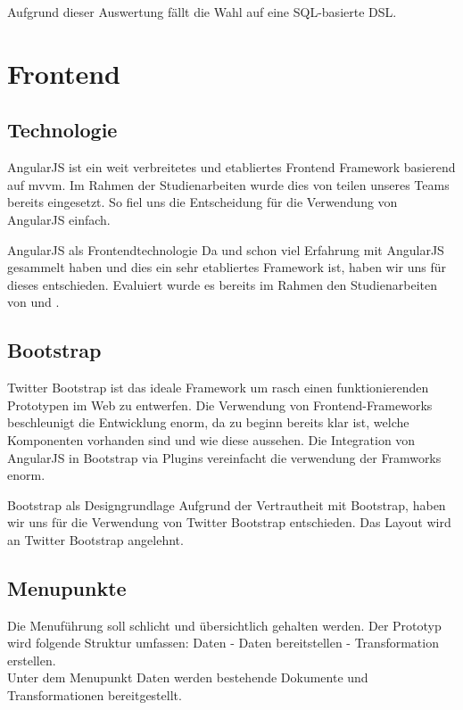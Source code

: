 Aufgrund dieser Auswertung fällt die Wahl auf eine SQL-basierte DSL.

\section{Frontend}
\subsection{Technologie}
AngularJS ist ein weit verbreitetes und etabliertes Frontend Framework basierend auf \acs{mvvm}. Im Rahmen der Studienarbeiten wurde dies von teilen unseres Teams bereits eingesetzt. So fiel uns die Entscheidung für die Verwendung von AngularJS einfach.
\begin{decision}[label=dec:frontend:technology]{AngularJS als Frontendtechnologie}
Da \chuf und \fscf schon viel Erfahrung mit AngularJS gesammelt haben und dies ein sehr etabliertes Framework ist, haben wir uns für dieses entschieden. Evaluiert wurde es bereits im Rahmen den Studienarbeiten von \fscf und \rlif.
\end{decision}
\subsection{Bootstrap}
Twitter Bootstrap ist das ideale Framework um rasch einen funktionierenden Prototypen im Web zu entwerfen. Die Verwendung von Frontend-Frameworks beschleunigt die Entwicklung enorm, da zu beginn bereits klar ist, welche Komponenten vorhanden sind und wie diese aussehen. Die Integration von AngularJS in Bootstrap via Plugins vereinfacht die verwendung der Framworks enorm.
\begin{decision}[label=dec:frontend:bootstrap]{Bootstrap als Designgrundlage}
Aufgrund der Vertrautheit mit Bootstrap, haben wir uns für die Verwendung von Twitter Bootstrap entschieden. Das Layout wird an Twitter Bootstrap angelehnt.
\end{decision}


\subsection{Menupunkte}
Die Menuführung soll schlicht und übersichtlich gehalten werden. Der Prototyp wird folgende Struktur umfassen: Daten - Daten bereitstellen - Transformation erstellen. \\
Unter dem Menupunkt Daten werden bestehende Dokumente und Transformationen bereitgestellt.\\


